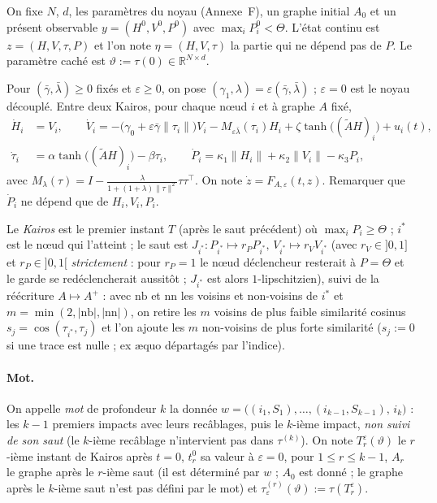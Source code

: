 \documentclass[11pt,a4paper]{article}
\theoremstyle{remark}
\theoremstyle{definition}
\newcommand{\R}{\mathbb R}
\newcommand{\norm}[1]{\lVert #1\rVert}
\newcommand{\eps}{\varepsilon}
\newcommand{\vth}{\vartheta}
\begin{document}
On fixe $N$, $d$, les paramètres du noyau (Annexe~F), un graphe initial $A_0$ et un présent observable $y=(H^0,V^0,P^0)$ avec $\max_iP^0_i<\Theta$. L'état continu est $z=(H,V,\tau,P)$ et l'on note $\eta=(H,V,\tau)$ la partie qui ne dépend pas de $P$. Le paramètre caché est $\vth:=\tau(0)\in\R^{N\times d}$.

Pour $(\bar\gamma,\bar\lambda)\ge0$ fixés et $\eps\ge0$, on pose $(\gamma_1,\lambda)=\eps(\bar\gamma,\bar\lambda)$ ; $\eps=0$ est le noyau découplé. Entre deux Kairos, pour chaque n\oe ud $i$ et à graphe $A$ fixé,
\begin{align*}
\dot H_i&=V_i,\qquad
\dot V_i=-\bigl(\gamma_0+\eps\bar\gamma\norm{\tau_i}\bigr)V_i-M_{\eps\bar\lambda}(\tau_i)H_i+\zeta\tanh\bigl((\tilde AH)_i\bigr)+u_i(t),\\
\dot\tau_i&=\alpha\tanh\bigl((\tilde AH)_i\bigr)-\beta\tau_i,\qquad
\dot P_i=\kappa_1\norm{H_i}+\kappa_2\norm{V_i}-\kappa_3P_i,
\end{align*}
avec $M_\lambda(\tau)=I-\frac{\lambda}{1+(1+\lambda)\norm\tau^2}\tau\tau^\top$. On note $\dot z=F_{A,\eps}(t,z)$. Remarquer que $\dot P_i$ ne dépend que de $H_i,V_i,P_i$.

Le \emph{Kairos} est le premier instant $T$ (après le saut précédent) où $\max_iP_i\ge\Theta$ ; $i^\ast$ est le n\oe ud qui l'atteint ; le saut est $J_{i^\ast}:P_{i^\ast}\mapsto r_PP_{i^\ast},\,V_{i^\ast}\mapsto r_VV_{i^\ast}$ (avec $r_V\in]0,1]$ et $r_P\in]0,1[$ \emph{strictement} : pour $r_P=1$ le nœud déclencheur resterait à $P=\Theta$ et le garde se redéclencherait aussitôt ; $J_{i^\ast}$ est alors $1$-lipschitzien), suivi de la réécriture $A\mapsto A^+$ : avec $\mathrm{nb}$ et $\mathrm{nn}$ les voisins et non-voisins de $i^\ast$ et $m=\min(2,|\mathrm{nb}|,|\mathrm{nn}|)$, on retire les $m$ voisins de plus faible similarité cosinus $s_j=\cos(\tau_{i^\ast},\tau_j)$ et l'on ajoute les $m$ non-voisins de plus forte similarité ($s_j:=0$ si une trace est nulle ; ex æquo départagés par l'indice).

\paragraph{Mot.} On appelle \emph{mot} de profondeur $k$ la donnée $w=\bigl((i_1,S_1),\dots,(i_{k-1},S_{k-1}),\,i_k\bigr)$ : les $k-1$ premiers impacts avec leurs recâblages, puis le $k$-ième impact, \emph{non suivi de son saut} (le $k$-ième recâblage n'intervient pas dans $\tau^{(k)}$). On note $T_r^\eps(\vth)$ le $r$-ième instant de Kairos après $t=0$, $t_r^0$ sa valeur à $\eps=0$, pour $1\le r\le k-1$, $A_r$ le graphe après le $r$-ième saut (il est déterminé par $w$ ; $A_0$ est donné ; le graphe après le $k$-ième saut n'est pas défini par le mot) et $\tau^{(r)}_\eps(\vth):=\tau(T_r^\eps)$.
\end{document}

